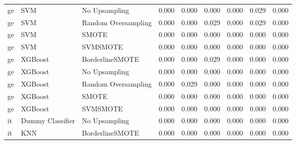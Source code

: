 \begin{tabular}{lllllllll}
      ge &                          SVM &       No Upsampling & 0.000 &                     0.000 &                 0.000 &                  0.000 &                                   0.029 &     0.000 \\
      ge &                          SVM & Random Oversampling & 0.000 &                     0.000 &                 0.029 &                  0.000 &                                   0.029 &     0.000 \\
      ge &                          SVM &               SMOTE & 0.000 &                     0.000 &                 0.000 &                  0.000 &                                   0.000 &     0.000 \\
      ge &                          SVM &            SVMSMOTE & 0.000 &                     0.000 &                 0.000 &                  0.000 &                                   0.000 &     0.000 \\
      ge &                      XGBoost &     BorderlineSMOTE & 0.000 &                     0.000 &                 0.029 &                  0.000 &                                   0.000 &     0.000 \\
      ge &                      XGBoost &       No Upsampling & 0.000 &                     0.000 &                 0.000 &                  0.000 &                                   0.000 &     0.000 \\
      ge &                      XGBoost & Random Oversampling & 0.000 &                     0.029 &                 0.000 &                  0.000 &                                   0.000 &     0.000 \\
      ge &                      XGBoost &               SMOTE & 0.000 &                     0.000 &                 0.000 &                  0.000 &                                   0.000 &     0.000 \\
      ge &                      XGBoost &            SVMSMOTE & 0.000 &                     0.000 &                 0.000 &                  0.000 &                                   0.000 &     0.000 \\
      it &             Dummy Classifier &       No Upsampling & 0.000 &                     0.000 &                 0.000 &                  0.000 &                                   0.000 &     0.000 \\
      it &                          KNN &     BorderlineSMOTE & 0.000 &                     0.000 &                 0.000 &                  0.000 &                                   0.000 &     0.000 \\

\end{tabular}
